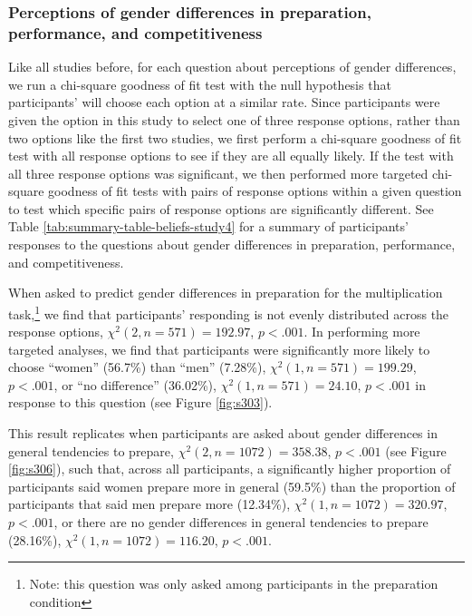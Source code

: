 \documentclass[letterpaper, nobind]{templates/ociamthesis}
\begin{document}
\hypertarget{perceptions-of-gender-differences-in-preparation-performance-and-competitiveness-3}{%
\subsubsection{Perceptions of gender differences in preparation, performance, and competitiveness}\label{perceptions-of-gender-differences-in-preparation-performance-and-competitiveness-3}}

Like all studies before, for each question about perceptions of gender differences, we run a chi-square goodness of fit test with the null hypothesis that participants' will choose each option at a similar rate. Since participants were given the option in this study to select one of three response options, rather than two options like the first two studies, we first perform a chi-square goodness of fit test with all response options to see if they are all equally likely. If the test with all three response options was significant, we then performed more targeted chi-square goodness of fit tests with pairs of response options within a given question to test which specific pairs of response options are significantly different. See Table \ref{tab:summary-table-beliefs-study4} for a summary of participants' responses to the questions about gender differences in preparation, performance, and competitiveness.

When asked to predict gender differences in preparation for the multiplication task,\footnote{Note: this question was only asked among participants in the preparation condition} we find that participants' responding is not evenly distributed across the response options, \(\chi^2(2, n = 571) = 192.97\), \(p < .001\). In performing more targeted analyses, we find that participants were significantly more likely to choose ``women'' (56.7\%) than ``men'' (7.28\%), \(\chi^2(1, n = 571) = 199.29\), \(p < .001\), or ``no difference'' (36.02\%), \(\chi^2(1, n = 571) = 24.10\), \(p < .001\) in response to this question (see Figure \ref{fig:s303}).

This result replicates when participants are asked about gender differences in general tendencies to prepare, \(\chi^2(2, n = 1072) = 358.38\), \(p < .001\) (see Figure \ref{fig:s306}), such that, across all participants, a significantly higher proportion of participants said women prepare more in general (59.5\%) than the proportion of participants that said men prepare more (12.34\%), \(\chi^2(1, n = 1072) = 320.97\), \(p < .001\), or there are no gender differences in general tendencies to prepare (28.16\%), \(\chi^2(1, n = 1072) = 116.20\), \(p < .001\).
\end{document}
